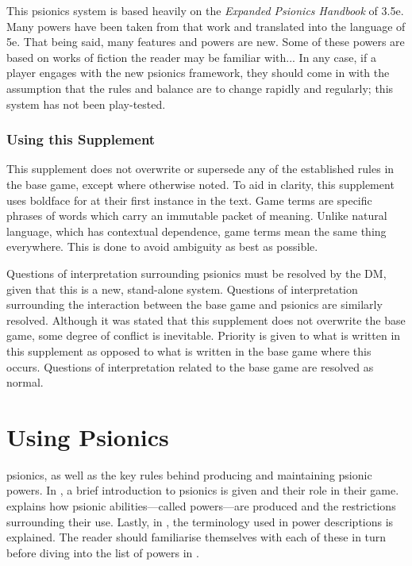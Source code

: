 This psionics system is based heavily on the
\emph{Expanded Psionics Handbook} of 3.5e.
Many powers have been taken from that work
and translated into the language of 5e.
That being said, many features and powers are new.
Some of these powers are based on works of fiction
the reader may be familiar with...
In any case,
if a player engages with the new psionics framework,
they should come in with the assumption that the rules
and balance are to change rapidly and regularly;
this system has not been play-tested.

\subsection*{Using this Supplement}
This supplement does not overwrite or supersede any
of the established rules in the base game,
except where otherwise noted.
To aid in clarity,
this supplement uses boldface for 
at their first instance in the text.
Game terms are specific phrases of words which
carry an immutable packet of meaning.
Unlike natural language,
which has contextual dependence,
game terms mean the same thing everywhere.
This is done to avoid ambiguity as best as possible.

Questions of interpretation surrounding psionics
must be resolved by the DM,
given that this is a new, stand-alone system.
Questions of interpretation surrounding the interaction
between the base game and psionics are similarly resolved.
Although it was stated that this supplement does not
overwrite the base game,
some degree of conflict is inevitable.
Priority is given to what is written in this supplement
as opposed to what is written in the base game
where this occurs.
Questions of interpretation related to the base game
are resolved as normal.

\chapter{Using Psionics}
\label{chap:using_psionics}
psionics, as well as the key rules behind
producing and maintaining psionic powers.
In ,
a brief introduction to psionics is given
and their role in their game.
 explains how
psionic abilities---called powers---are produced
and the restrictions surrounding their use.
Lastly,
in ,
the terminology used in power descriptions is explained.
The reader should familiarise themselves with each of these in turn
before diving into
the list of powers in .

